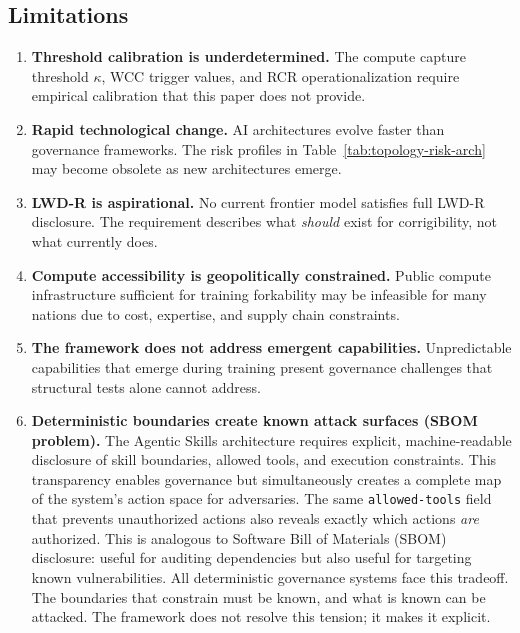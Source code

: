 \documentclass[11pt,a4paper]{article}
\theoremstyle{definition}
\begin{document}
\subsection{Limitations}

\begin{enumerate}
    \item \textbf{Threshold calibration is underdetermined.} The compute capture threshold $\kappa$, WCC trigger values, and RCR operationalization require empirical calibration that this paper does not provide.

    \item \textbf{Rapid technological change.} AI architectures evolve faster than governance frameworks. The risk profiles in Table~\ref{tab:topology-risk-arch} may become obsolete as new architectures emerge.

    \item \textbf{LWD-R is aspirational.} No current frontier model satisfies full LWD-R disclosure. The requirement describes what \textit{should} exist for corrigibility, not what currently does.

    \item \textbf{Compute accessibility is geopolitically constrained.} Public compute infrastructure sufficient for training forkability may be infeasible for many nations due to cost, expertise, and supply chain constraints.

    \item \textbf{The framework does not address emergent capabilities.} Unpredictable capabilities that emerge during training present governance challenges that structural tests alone cannot address.

    \item \textbf{Deterministic boundaries create known attack surfaces (SBOM problem).} The Agentic Skills architecture requires explicit, machine-readable disclosure of skill boundaries, allowed tools, and execution constraints. This transparency enables governance but simultaneously creates a complete map of the system's action space for adversaries. The same \texttt{allowed-tools} field that prevents unauthorized actions also reveals exactly which actions \textit{are} authorized. This is analogous to Software Bill of Materials (SBOM) disclosure: useful for auditing dependencies but also useful for targeting known vulnerabilities. All deterministic governance systems face this tradeoff. The boundaries that constrain must be known, and what is known can be attacked. The framework does not resolve this tension; it makes it explicit.
\end{enumerate}
\end{document}
